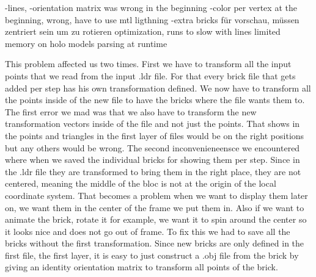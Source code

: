\documentclass[11pt,a4paper]{article}
\begin{document}
	-lines,
	-orientation matrix was wrong in the beginning
	-color per vertex at the beginning, wrong, have to use mtl
	ligthning
	-extra bricks für vorschau, müssen zentriert sein um zu rotieren
	optimization, runs to slow with lines
	limited memory on holo
	models parsing at runtime
	\begin{description}[align=left]
		\item [Wrong orientation matrix] 
		This problem affected us two times. First we have to transform  all the input points that we read from the input .ldr file. For that every brick file that gets added per step has his own transformation  defined. We now have to transform all the points inside of the new file to have the bricks where the file wants them to. The first error we mad was that we also have to transform the new transformation vectors inside of the file and not just the points. That shows in the points and triangles in the first layer of files would be on the right positions but any others would be wrong. \newline
		The second inconvenieneensce we encountered where when we saved the individual bricks for showing them per step. Since in the .ldr file they are transformed to bring them in the right place, they are not centered, meaning the middle of the bloc is not at the origin of the local coordinate system. That becomes a problem when we want to display them later on, we want them in the center of the frame we put them in. Also if we want to animate the brick, rotate it for example, we want it to spin around the center so it looks nice and does not go out of frame.
		To fix this we had to save all the bricks without the first transformation. Since new bricks are only defined in the first file, the first layer, it is easy to just construct a .obj file from the brick by giving an identity orientation matrix to transform all points of the brick.
		

\end{description}
\end{document}
